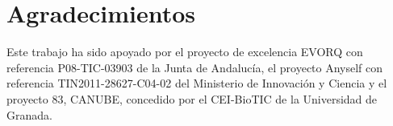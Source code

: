 \documentclass{llncs}
\begin{document}

\section*{Agradecimientos}
Este trabajo ha sido apoyado por el proyecto de excelencia EVORQ con
referencia P08-TIC-03903 de la Junta de Andalucía, el proyecto Anyself
con referencia TIN2011-28627-C04-02 del Ministerio de Innovación y
Ciencia y el proyecto 83, CANUBE, concedido por el CEI-BioTIC de la
Universidad de Granada. 





\end{document}

